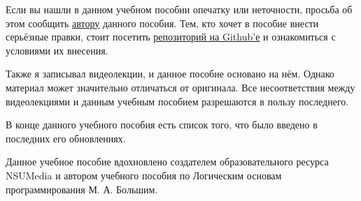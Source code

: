 \documentclass[17pt, a4paper]{extarticle}
\begin{document}

	Если вы нашли в данном учебном пособии опечатку или неточности, просьба
	об этом сообщить \href{https://vk.com/id212526330}{\underline{автору}}
	данного пособия. Тем, кто хочет в пособие внести серьёзные правки, стоит
	посетить \href{https://github.com/mu2so4/Computational-Mathematics-Book}
	{\underline{репозиторий на Github'е}} и ознакомиться с условиями их
	внесения.

	Также я записывал видеолекции, и данное пособие основано на нём. Однако
	материал может значительно отличаться от оригинала. Все несоответствия
	между видеолекциями и данным учебным пособием разрешаются в пользу
	последнего.

	В конце данного учебного пособия есть список того, что было введено в
	последних его обновлениях.
	\newline\newline

	Данное учебное пособие вдохновлено создателем образовательного ресурса
	NSUMedia и автором учебного пособия по Логическим основам
	программирования М. А. Большим.
\end{document}
